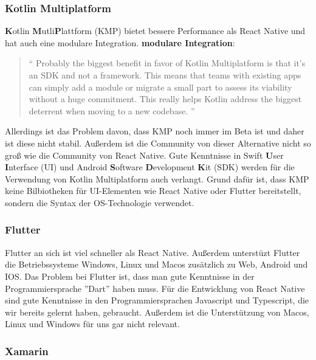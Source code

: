\begin{spacing}{1}
    \subsubsection{Kotlin Multiplatform}
    \textbf{K}otlin \textbf{M}utli\textbf{P}lattform (KMP) bietet bessere Performance als React Native und hat auch eine modulare Integration.
    \newline
    \textbf{modulare Integration}: \begin{quotation}
        ``
        Probably the biggest benefit in favor of Kotlin Multiplatform is that it’s
        an SDK and not a framework. This means that teams with existing apps can
        simply add a module or migrate a small part to assess its viability without
        a huge commitment. This really helps Kotlin address the biggest deterrent
        when moving to a new codebase.
        ''
        \cite{kotlin-multiplatform-vs-react-native}
    \end{quotation}
    Allerdings ist das Problem davon, dass KMP noch immer im Beta ist und daher ist diese nicht stabil.
    Außerdem  ist die Community von dieser Alternative nicht so groß wie die Community von React Native.
    Gute Kenntnisse in Swift \textbf{U}ser \textbf{I}nterface (UI) und Android \textbf{S}oftware \textbf{D}evelopment \textbf{K}it (SDK) werden für die Verwendung von Kotlin Multiplatform auch verlangt.
    Grund dafür ist, dass KMP keine Bilbiotheken für UI-Elementen wie React Native oder Flutter bereitstellt, sondern die Syntax der OS-Technologie verwendet.
    \cite{kotlin-multiplatform-vs-react-native}
    \subsubsection{Flutter}

    Flutter an sich ist viel schneller als React Native.
    Außerdem unterstüzt Flutter die Betriebssysteme  Windows, Linux und Macos zusätzlich zu Web, Android und IOS.
    \cite{flutter-vs-react-native}
    \newline
    Das Problem bei Flutter ist, dass man gute Kenntnisse in der Programmiersprache ''Dart'' haben muss. \cite{flutter-vs-react-native}
    Für die Entwicklung von React Native sind gute Kenntnisse in den Programmiersprachen Javascript und Typescript,
    die wir bereits gelernt haben,
    gebraucht.
    Außerdem ist die Unterstützung von Macos, Linux und Windows für uns gar nicht relevant.


    \subsubsection{Xamarin}


\end{spacing}
